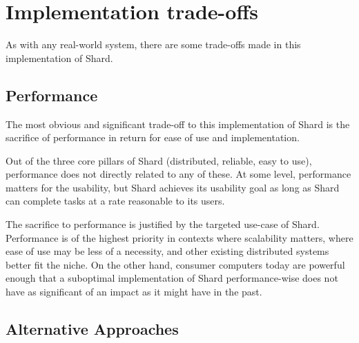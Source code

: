 \documentclass[twoside]{report}
\newcommand{\todoi}[1]{\todo[inline, color=blue!20]{TODO: {#1}}}
\begin{document}
\section{Implementation trade-offs}

As with any real-world system, there are some trade-offs made in this implementation of Shard.

\subsection{Performance}

The most obvious and significant trade-off to this implementation of Shard is the sacrifice of performance in return for ease of use and implementation.

Out of the three core pillars of Shard (distributed, reliable, easy to use), performance does not directly related to any of these.
At some level, performance matters for the usability, but Shard achieves its usability goal as long as Shard can complete tasks at a rate reasonable to its users.

The sacrifice to performance is justified by the targeted use-case of Shard.
Performance is of the highest priority in contexts where scalability matters, where ease of use may be less of a necessity, and other existing distributed systems better fit the niche.
On the other hand, consumer computers today are powerful enough that a suboptimal implementation of Shard performance-wise does not have as significant of an impact as it might have in the past.


\subsection{Alternative Approaches}
\end{document}
